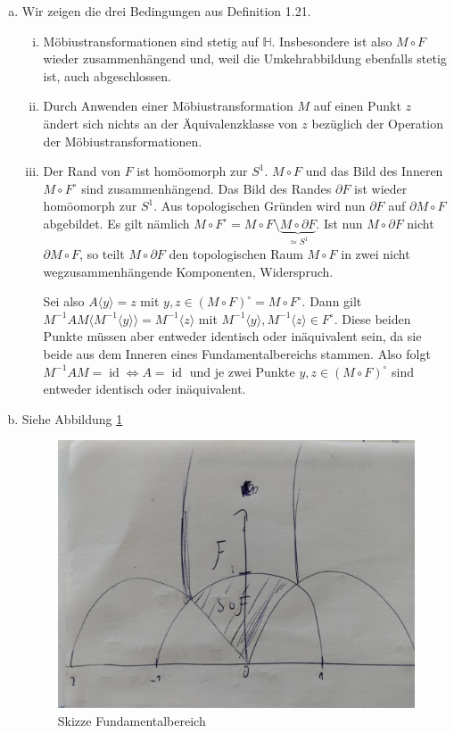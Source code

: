 \documentclass{article}
\begin{document}
\begin{enumerate}[(a)]
    \item Wir zeigen die drei Bedingungen aus Definition 1.21.
    \begin{enumerate}[(i)]
        \item Möbiustransformationen sind stetig auf $\mathbb{H}$. Insbesondere ist also $M \circ F$ wieder zusammenhängend und, weil die Umkehrabbildung ebenfalls stetig ist, auch abgeschlossen.
        \item Durch Anwenden einer Möbiustransformation $M$ auf einen Punkt $z$ ändert sich nichts an der Äquivalenzklasse von $z$ bezüglich der Operation der Möbiustransformationen.
        \item Der Rand von $F$ ist homöomorph zur $S^1$. $M \circ F$ und das Bild des Inneren $M\circ F^\circ$ sind zusammenhängend.
        Das Bild des Randes $\partial F$ ist wieder homöomorph zur $S^1$. Aus topologischen Gründen wird nun $\partial F$ auf $\partial M \circ F$ abgebildet. Es gilt nämlich $M \circ F^\circ = M \circ F \setminus \underbrace{M \circ \partial F}_{\simeq S^1}$. Ist nun $M \circ \partial F$ nicht $\partial M\circ F$, so teilt $M \circ \partial F$ den topologischen Raum $M \circ F$ in zwei nicht wegzusammenhängende Komponenten, Widerspruch.

        Sei also $A\langle y\rangle = z$ mit $y, z \in (M \circ F)^ \circ = M\circ F^\circ$.
        Dann gilt $M^{-1} A M \langle M^{-1}\langle y\rangle \rangle = M^{-1}\langle z \rangle$ mit $M^{-1}\langle y \rangle, M^{-1}\langle z \rangle \in F^\circ$.
        Diese beiden Punkte müssen aber entweder identisch oder inäquivalent sein, da sie beide aus dem Inneren eines Fundamentalbereichs stammen.
        Also folgt $M^{-1}A M = \operatorname{id} \Leftrightarrow A = \operatorname{id}$ und je zwei Punkte $y,z \in (M \circ F)^\circ$ sind entweder identisch oder inäquivalent.
    \end{enumerate}
    \item Siehe Abbildung \ref{fig:fundamentalbereich}
    \begin{figure}[h!]
        \includegraphics[width=\textwidth]{fundamentalbereich.jpeg}
        \caption{Skizze Fundamentalbereich}
        \label{fig:fundamentalbereich}
    \end{figure}
\end{enumerate}
\end{document}

